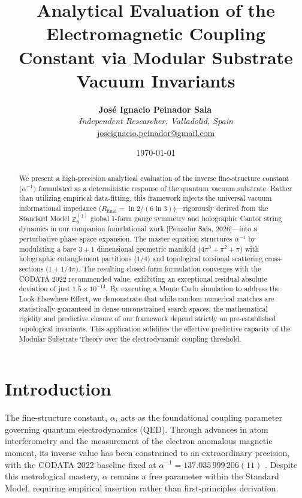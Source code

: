 \documentclass[12pt,a4paper]{article}
\title{\textbf{Analytical Evaluation of the Electromagnetic Coupling Constant via Modular Substrate Vacuum Invariants}}
\author{
  \textbf{José Ignacio Peinador Sala}\,\orcidlink{0009-0008-1822-3452} \\
  \textit{Independent Researcher, Valladolid, Spain} \\
  \small\href{mailto:joseignacio.peinador@gmail.com}{joseignacio.peinador@gmail.com}
}
\date{\today}
\begin{document}
\maketitle


\begin{abstract}
We present a high-precision analytical evaluation of the inverse fine-structure constant ($\alpha^{-1}$) formulated as a deterministic response of the quantum vacuum substrate. Rather than utilizing empirical data-fitting, this framework injects the universal vacuum informational impedance ($R_{\text{fund}} = \ln 2 / (6 \ln 3)$)—rigorously derived from the Standard Model $\mathbb{Z}_6^{(1)}$ global 1-form gauge symmetry and holographic Cantor string dynamics in our companion foundational work [Peinador Sala, 2026]—into a perturbative phase-space expansion. The master equation structures $\alpha^{-1}$ by modulating a bare $3+1$ dimensional geometric manifold ($4\pi^3 + \pi^2 + \pi$) with holographic entanglement partitions ($1/4$) and topological torsional scattering cross-sections ($1 + 1/4\pi$). The resulting closed-form formulation converges with the CODATA 2022 recommended value, exhibiting an exceptional residual absolute deviation of just $1.5 \times 10^{-14}$. By executing a Monte Carlo simulation to address the Look-Elsewhere Effect, we demonstrate that while random numerical matches are statistically guaranteed in dense unconstrained search spaces, the mathematical rigidity and predictive closure of our framework depend strictly on pre-established topological invariants. This application solidifies the effective predictive capacity of the Modular Substrate Theory over the electrodynamic coupling threshold.
\end{abstract}


\section{Introduction}

The fine-structure constant, $\alpha$, acts as the foundational coupling parameter governing quantum electrodynamics (QED). Through advances in atom interferometry and the measurement of the electron anomalous magnetic moment, its inverse value has been constrained to an extraordinary precision, with the CODATA 2022 baseline fixed at $\alpha^{-1} = 137.035\,999\,206(11)$ \cite{codata2022}. Despite this metrological mastery, $\alpha$ remains a free parameter within the Standard Model, requiring empirical insertion rather than first-principles derivation.
\end{document}
